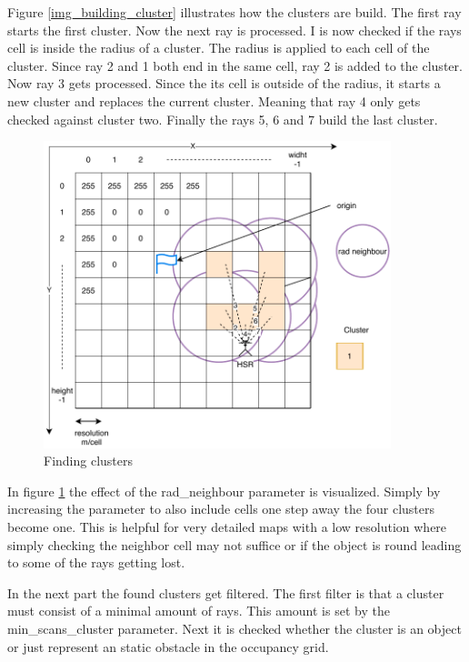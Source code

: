 \documentclass[main.tex]{subfiles}
\begin{document}
		Figure \ref{img_building_cluster} illustrates how the clusters are build. The first ray starts the first cluster. Now the next ray is processed. I is now checked if the rays cell is inside the radius of a cluster. The radius is applied to each cell of the cluster. Since ray 2 and 1 both end in the same cell, ray 2 is added to the cluster. Now ray 3 gets processed. Since the its cell is outside of the radius, it starts a new cluster and replaces the current cluster. Meaning that ray 4 only gets checked against cluster two. Finally the rays 5, 6 and 7 build the last cluster.
		
		\begin{figure}[H]
			\centering
			\includegraphics[width=0.9\textwidth]{pictures/obstacle_finder/Cluster-building3.pdf}
			\caption{Finding clusters}
			\label{img_building_cluster-2}
		\end{figure}
	
		In figure \ref{img_building_cluster-2} the effect of the rad\_neighbour parameter is visualized. Simply by increasing the parameter to also include cells one step away the four clusters become one. This is helpful for very detailed maps with a low resolution where simply checking the neighbor cell may not suffice or if the object is round leading to some of the rays getting lost.
		
		In the next part the found clusters get filtered. The first filter is that a cluster must consist of a minimal amount of rays. This amount is set by the min\_scans\_cluster parameter. Next it is checked whether the cluster is an object or just represent an static obstacle in the occupancy grid.
		
\end{document}
